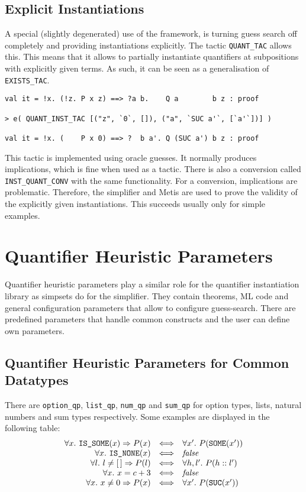\documentclass[a4paper,12pt,DIV=12,oneside]{scrbook}
\theoremstyle{definition}
\theoremstyle{remark}
\begin{document}
\subsection{Explicit Instantiations}

A special (slightly degenerated) use of the framework, is turning guess search off completely and
providing instantiations explicitly. The tactic \texttt{QUANT\_TAC} allows this. This means that
it allows to partially instantiate quantifiers at subpositions
with explicitly given terms. As such, it can be seen as 
a generalisation of \texttt{EXISTS\_TAC}. 
%
{\scriptsize
\begin{verbatim}
val it = !x. (!z. P x z) ==> ?a b.    Q a        b z : proof

> e( QUANT_INST_TAC [("z", `0`, []), ("a", `SUC a'`, [`a'`])] )

val it = !x. (    P x 0) ==> ?  b a'. Q (SUC a') b z : proof
\end{verbatim}}
%
This tactic is implemented using oracle guesses. It normally
produces implications, which is fine when used as a tactic. There is
also a conversion called \texttt{INST\_QUANT\_CONV} with the same
functionality. For a conversion, implications are
problematic. Therefore, the simplifier and Metis are used to prove
the validity of the explicitly given instantiations. This succeeds
usually only for simple examples.


\section{Quantifier Heuristic Parameters}\label{sec_qps}

Quantifier heuristic parameters play a similar role for the quantifier
instantiation library as simpsets do for the simplifier. They contain
theorems, ML code and general configuration parameters that allow to configure
guess-search. There are predefined parameters that handle
common constructs and the user can define own parameters.

\subsection{Quantifier Heuristic Parameters for Common Datatypes}

There are \texttt{option\_qp}, \texttt{list\_qp}, \texttt{num\_qp} and \texttt{sum\_qp} for option types, lists, 
natural numbers and sum types respectively. 
Some examples are displayed in the following table:
%
\[\begin{array}{r@{\quad \Longleftrightarrow \quad}l}
\forall x.\ \texttt{IS\_SOME}(x) \Rightarrow P(x) & \forall x'.\ P (\texttt{SOME}(x')) \\
\forall x.\ \texttt{IS\_NONE}(x)& \textit{false} \\
\forall l.\ l \neq [\,] \Rightarrow P(l)& \forall h, l'.\ P(h::l')  \\
\forall x.\ x = c + 3& \textit{false} \\
\forall x.\ x \neq 0 \Rightarrow P(x)& \forall x'.\ P(\texttt{SUC}(x')) 
\end{array}\]
\end{document}
